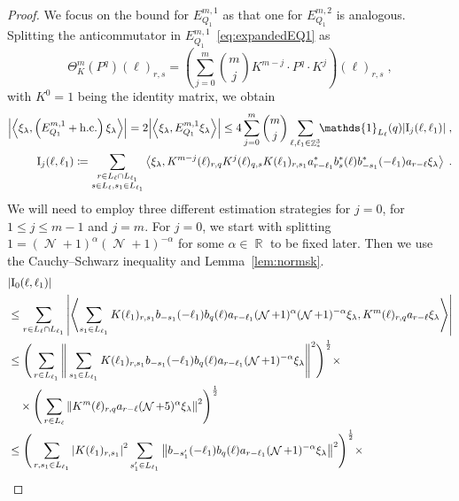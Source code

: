 \documentclass[12pt,a4paper]{article}
\numberwithin{equation}{section}
\newcommand{\1}{\mathbb{I}}
\newcommand{\I}{\mathrm{I}}
\DeclareMathOperator{\R}{\mathbb{R}}
\DeclareMathOperator{\Z}{\mathbb{Z}}
\DeclareMathOperator{\NN}{\mathcal{N}}
\newcommand{\half}{\frac{1}{2}}
\newcommand{\eva}[1]{\left\langle #1 \right\rangle}
\theoremstyle{plain}
\theoremstyle{definition}
\theoremstyle{remark}
\theoremstyle{plain}
\theoremstyle{definition}
\theoremstyle{remark}
\begin{document}
\begin{proof}
We focus on the bound for $ E^{m,1}_{Q_1} $ as that one for $ E^{m,2}_{Q_1} $ is analogous. Splitting the anticommutator in $ E^{m,1}_{Q_1} $~\eqref{eq:expandedEQ1} as
\begin{equation} \label{eq:q-q}
	\Theta^m_K(P^q)(\ell)_{r,s}
	= \left(\sum_{j=0}^m {{m}\choose j} K^{m-j} \cdot P^q \cdot K^{j}\right) \! (\ell)_{r,s} \;,
\end{equation}
with $ K^0 = 1 $ being the identity matrix, we obtain
\begin{equation} \label{eq:EQ1111}
\begin{aligned}
	\abs{\eva{\xi_\lambda,\left(E^{m,1}_{Q_1}+\mathrm{h.c.}\right) \xi_\lambda }} 
	= 2\abs{\eva{\xi_\lambda, E^{m,1}_{Q_1} \xi_\lambda }}
	\le 4 \sum_{j=0}^m {{m}\choose j} \sum_{\ell,\ell_1  \in \Z^3_*}\!\! \mathds{1}_{L_\ell}(q) |\I_j(\ell, \ell_1)| \;,\\
	\I_j(\ell, \ell_1)
	\coloneq \sum_{\substack{r\in L_{\ell} \cap L_{\ell_1}\\ s \in L_{\ell},s_1\in L_{\ell_1}}}
		\eva{\xi_\lambda, K^{m-j}(\ell)_{r,q} K^{j}(\ell)_{q,s} K(\ell_1)_{r,s_1} a^*_{r-\ell_1} b^*_{s}(\ell) b^*_{-s_1}(-\ell_1) a_{r-\ell} \xi_\lambda} \;. \\
\end{aligned}
\end{equation}
We will need to employ three different estimation strategies for $ j = 0 $, for $ 1 \le j \le m-1 $ and $ j = m $. For $ j = 0 $, we start with splitting $1 = (\NN+1)^{\alpha}(\NN+1)^{-\alpha}$ for some $\alpha \in \R$ to be fixed later. Then we use the Cauchy--Schwarz inequality and Lemma~\ref{lem:normsk}.
\begin{align}
	&|\I_0(\ell, \ell_1)| \nonumber\\
	&\le \sum_{r \in L_\ell \cap L_{\ell_1}} \abs{\eva{ \sum_{s_1 \in L_{\ell_1}} K(\ell_1)_{r,s_1} b_{-s_1}(-\ell_1) b_{q}(\ell) a_{r-\ell_1} (\NN+1)^{\alpha} (\NN+1)^{-\alpha} \xi_\lambda, K^{m}(\ell)_{r,q} a_{r-\ell} \xi_\lambda }}\nonumber\\
	&\leq \Bigg( \sum_{r \in L_{\ell_1}} \Bigg\Vert \sum_{s_1 \in L_{\ell_1}} K(\ell_1)_{r,s_1} b_{-s_1}(-\ell_1) b_{q}(\ell) a_{r-\ell_1} (\NN+1)^{-\alpha}\xi_\lambda \Bigg\Vert^2\Bigg)^\half \times\nonumber\\
	&\quad \times \Bigg( \sum_{r \in L_\ell} \norm{  K^{m}(\ell)_{r,q} a_{r-\ell} (\NN+5)^{\alpha}\xi_\lambda }^2\Bigg)^\half \nonumber\\
	&\leq \Bigg( \sum_{r,s_1 \in L_{\ell_1}}\abs{K(\ell_1)_{r,s_1}}^2 \sum_{s_1' \in L_{\ell_1}} \norm{ b_{-s_1'}(-\ell_1) b_{q}(\ell) a_{r-\ell_1} (\NN+1)^{-\alpha}\xi_\lambda}^2\Bigg)^\half \times\nonumber\\

\end{align}
\end{proof}
\end{document}
